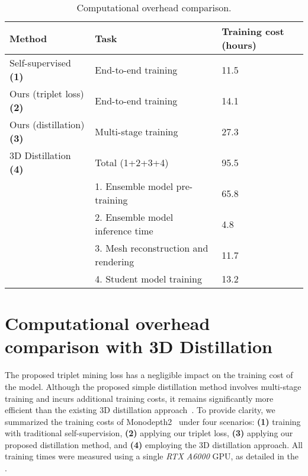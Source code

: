 \begin{table}[ht]
  \caption{Computational overhead comparison.}
  \label{tab:computational}
  \centering
\begin{tabular}{@{}lll@{}}
  \toprule
  Method & Task & Training cost (hours) \\
  \midrule
  Self-supervised \hfill \textbf{(1)} & End-to-end training & 11.5 \\
  \midrule
  Ours (triplet loss) \hfill \textbf{(2)} & End-to-end training & 14.1 \\
  \midrule
  Ours (distillation) \hfill \textbf{(3)} & Multi-stage training & 27.3 \\
  \midrule
  3D Distillation \hfill \textbf{(4)} & Total (1+2+3+4) & 95.5 \\
  & 1. Ensemble model pre-training & 65.8 \\
  & 2. Ensemble model inference time & 4.8 \\
  & 3. Mesh reconstruction and rendering & 11.7 \\
  & 4. Student model training & 13.2 \\
  \bottomrule
  \end{tabular}%
\end{table}

\section{Computational overhead comparison with 3D Distillation}
The proposed triplet mining loss has a negligible impact on the training cost of the model.
Although the proposed simple distillation method involves multi-stage training and incurs additional training costs, it remains significantly more efficient than the existing 3D distillation approach~\citep{shi20233d}.
To provide clarity, we summarized the training costs of Monodepth2~\citep{godard2019digging} under four scenarios: \textbf{(1)} training with traditional self-supervision, \textbf{(2)} applying our triplet loss, \textbf{(3)} applying our proposed distillation method, and \textbf{(4)} employing the 3D distillation approach.
All training times were measured using a single \textit{RTX A6000} GPU, as detailed in the .

